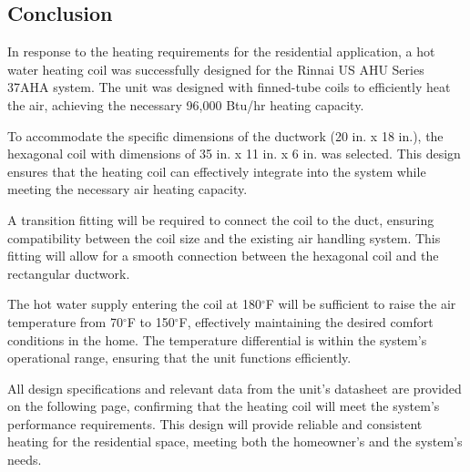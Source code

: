 \subsection{Conclusion}
In response to the heating requirements for the residential application, a hot water heating coil was successfully designed for the Rinnai US AHU Series 37AHA system. The unit was designed with finned-tube coils to efficiently heat the air, achieving the necessary 96,000 Btu/hr heating capacity.

To accommodate the specific dimensions of the ductwork (20 in. x 18 in.), the hexagonal coil with dimensions of 35 in. x 11 in. x 6 in. was selected. This design ensures that the heating coil can effectively integrate into the system while meeting the necessary air heating capacity.

A transition fitting will be required to connect the coil to the duct, ensuring compatibility between the coil size and the existing air handling system. This fitting will allow for a smooth connection between the hexagonal coil and the rectangular ductwork.

The hot water supply entering the coil at 180$^\circ$F will be sufficient to raise the air temperature from 70$^\circ$F to 150$^\circ$F, effectively maintaining the desired comfort conditions in the home. The temperature differential is within the system's operational range, ensuring that the unit functions efficiently.

All design specifications and relevant data from the unit's datasheet are provided on the following page, confirming that the heating coil will meet the system's performance requirements. This design will provide reliable and consistent heating for the residential space, meeting both the homeowner's and the system's needs.

